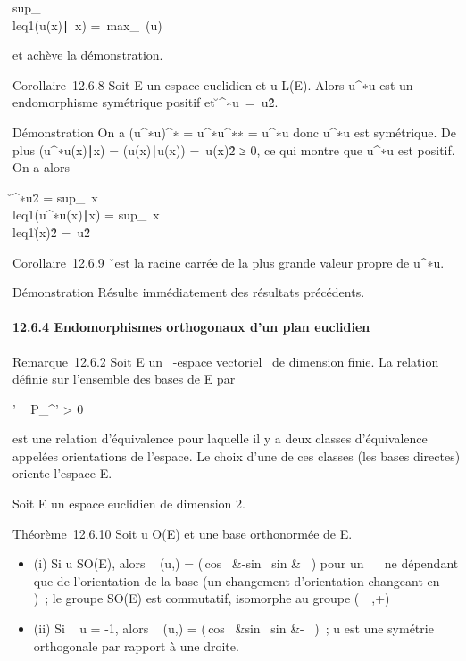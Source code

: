 \documentclass[]{article}
\begin{document}
sup_\x\\leq1(u(x)\mathrel∣~x)
=\
max_\lambda~\in{}(u)~\lambda~

et achève la démonstration.

Corollaire~12.6.8 Soit E un espace euclidien et u \in L(E). Alors
u^∗u est un endomorphisme symétrique positif et
\u^∗u\
=\ u\^2.

Démonstration On a (u^∗u)^∗ =
u^∗u^∗∗ = u^∗u donc u^∗u est
symétrique. De plus (u^∗u(x)∣x) =
(u(x)∣u(x)) =\
u(x)\^2 ≥ 0, ce qui montre que
u^∗u est positif. On a alors

\u^∗u\^2
= sup_\
x\\leq1(u^∗u(x)∣x)
= sup_\
x\\leq1\u(x)\^2
=\ u\^2

Corollaire~12.6.9 \u\
est la racine carrée de la plus grande valeur propre de u^∗u.

Démonstration Résulte immédiatement des résultats précédents.

\paragraph{12.6.4 Endomorphismes orthogonaux d'un plan euclidien}

Remarque~12.6.2 Soit E un \mathbb{R}~-espace vectoriel ~de dimension finie. La
relation définie sur l'ensemble des bases de E par

'\Leftrightarrow
\mathrm{det}~
P_^' > 0

est une relation d'équivalence pour laquelle il y a deux classes
d'équivalence appelées orientations de l'espace. Le choix d'une de ces
classes (les bases directes) oriente l'espace E.

Soit E un espace euclidien de dimension 2.

Théorème~12.6.10 Soit u \in O(E) et  une base orthonormée de E.

\begin{itemize}
\itemsep1pt\parskip0pt
\item
  (i) Si u \in SO(E), alors
  \mathrmMat~ (u,\mathcal{E}) =
  \left
  (\matrix\,cos~
  \theta&-sin~ \theta\cr
  sin \theta &\cos~
  \theta\right ) pour un \theta \in {}~\pi~ ne dépendant que de
  l'orientation de la base  (un changement d'orientation changeant \theta en
  - \theta)~; le groupe SO(E) est commutatif, isomorphe au groupe (~\pi~,+)
\item
  (ii) Si \mathrm{det}~ u =
  -1, alors \mathrmMat~
  (u,\mathcal{E}) = \left
  (\matrix\,cos~
  \theta&sin~ \theta \cr
  sin \theta&-\cos~
  \theta\right )~; u est une symétrie orthogonale par
  rapport à une droite.
\end{itemize}
\end{document}

